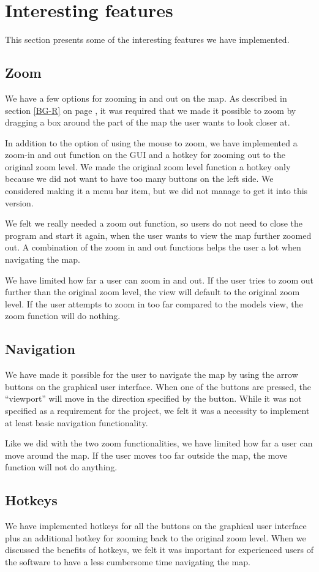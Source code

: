 \section{Interesting features}
\label{UIA-IF}
This section presents some of the interesting features we have implemented.
\subsection{Zoom}
\label{UIA-IF-Z}
We have a few options for zooming in and out on the map. As described in
section \ref{BG-R}  on page \pageref{BG-R}, it
was required that we made it possible to zoom by dragging a box around the part 
of the map the user wants to look closer at.

In addition to the option of using the mouse to zoom, we have implemented a
zoom-in and out function on the GUI and a hotkey for zooming out to the original
zoom level. We made the original zoom level function a hotkey only because we
did not want to have too many buttons on the left side. We considered making it a menu bar
item, but we did not manage to get it into this version.

We felt we really needed a zoom out function, so users do not need to close the
program and start it again, when the user wants to view the map further zoomed
out. A combination of the zoom in and out functions helps the user a lot when
navigating the map.

We have limited how far a user can zoom in and out. If the user tries to zoom
out further than the original zoom level, the view will default to the original
zoom level. If the user attempts to zoom in too far compared to the models view,
the zoom function will do nothing.
\subsection{Navigation}
\label{UIA-IF-N}
We have made it possible for the user to navigate the map by using the arrow
buttons on the graphical user interface. When one of the buttons are pressed,
the ``viewport'' will move in the direction specified by the button. While it
was not specified as a requirement for the project, we felt it was a necessity to
implement at least basic navigation functionality.

Like we did with the two zoom functionalities, we have limited how far a user
can move around the map. If the user moves too far outside the map, the move
function will not do anything.
\subsection{Hotkeys}
\label{UIA-IF-H}
We have implemented hotkeys for all the buttons on the graphical user interface
plus an additional hotkey for zooming back to the original zoom level. When we
discussed the benefits of hotkeys, we felt it was important for experienced users of the
software to have a less cumbersome time navigating the map. 


